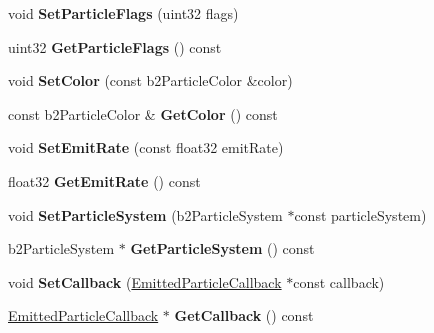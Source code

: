 \begin{DoxyCompactItemize}
\item 
\hypertarget{classRadialEmitter_af397a1f783787fea82d0a3196090e4bf}{void {\bfseries Set\-Particle\-Flags} (uint32 flags)}\label{classRadialEmitter_af397a1f783787fea82d0a3196090e4bf}

\item 
\hypertarget{classRadialEmitter_aca340fca74f54c4f37a697011ac60f94}{uint32 {\bfseries Get\-Particle\-Flags} () const }\label{classRadialEmitter_aca340fca74f54c4f37a697011ac60f94}

\item 
\hypertarget{classRadialEmitter_af88a107b46d81953d5ee1fa0f9a0db33}{void {\bfseries Set\-Color} (const b2\-Particle\-Color \&color)}\label{classRadialEmitter_af88a107b46d81953d5ee1fa0f9a0db33}

\item 
\hypertarget{classRadialEmitter_a4076754f3619abf5bfba7ab121cb3369}{const b2\-Particle\-Color \& {\bfseries Get\-Color} () const }\label{classRadialEmitter_a4076754f3619abf5bfba7ab121cb3369}

\item 
\hypertarget{classRadialEmitter_a9ef46fd5e52e3e81f73594db90019e2c}{void {\bfseries Set\-Emit\-Rate} (const float32 emit\-Rate)}\label{classRadialEmitter_a9ef46fd5e52e3e81f73594db90019e2c}

\item 
\hypertarget{classRadialEmitter_a8f2ed81d05d5ecbc74084dc7b6d1ba9b}{float32 {\bfseries Get\-Emit\-Rate} () const }\label{classRadialEmitter_a8f2ed81d05d5ecbc74084dc7b6d1ba9b}

\item 
\hypertarget{classRadialEmitter_a3ebdd4139fffc06d4c96cfff99eccf8c}{void {\bfseries Set\-Particle\-System} (b2\-Particle\-System $\ast$const particle\-System)}\label{classRadialEmitter_a3ebdd4139fffc06d4c96cfff99eccf8c}

\item 
\hypertarget{classRadialEmitter_a094b585f881dde7f20b139ef26ea041d}{b2\-Particle\-System $\ast$ {\bfseries Get\-Particle\-System} () const }\label{classRadialEmitter_a094b585f881dde7f20b139ef26ea041d}

\item 
\hypertarget{classRadialEmitter_af1e48268753129d0996cc67a7be664aa}{void {\bfseries Set\-Callback} (\hyperlink{classEmittedParticleCallback}{Emitted\-Particle\-Callback} $\ast$const callback)}\label{classRadialEmitter_af1e48268753129d0996cc67a7be664aa}

\item 
\hypertarget{classRadialEmitter_acf08ecb75ff414cf648cb7d0992021d4}{\hyperlink{classEmittedParticleCallback}{Emitted\-Particle\-Callback} $\ast$ {\bfseries Get\-Callback} () const }\label{classRadialEmitter_acf08ecb75ff414cf648cb7d0992021d4}


\end{DoxyCompactItemize}
